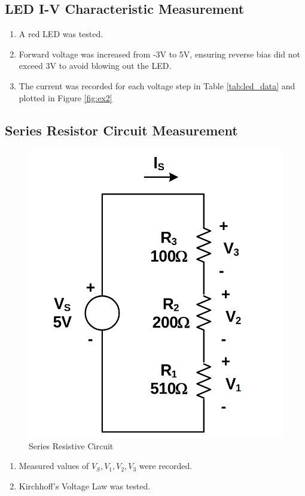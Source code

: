 \documentclass[12pt]{article}
\begin{document}
\subsection{LED I-V Characteristic Measurement}
\begin{enumerate}
	\item A red LED was tested.
	\item Forward voltage was increased from -3V to 5V, ensuring reverse bias did
	      not exceed 3V to avoid blowing out the LED.
	\item The current was recorded for each voltage step in Table
	      \ref{tab:led_data} and plotted in Figure \ref{fig:ex2}
\end{enumerate}

\subsection{Series Resistor Circuit Measurement}

\begin{figure}[H]
	\center
	\includegraphics[scale=.2]{exp3}
	\caption{Series Resistive Circuit}
	\label{fig:exp3}
\end{figure}
\begin{enumerate}
	\item Measured values of \( V_S, V_1, V_2, V_3 \) were recorded.
	\item Kirchhoff’s Voltage Law was tested.
\end{enumerate}
\end{document}
